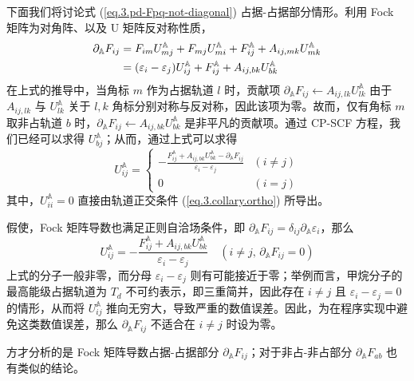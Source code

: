 下面我们将讨论式 (\ref{eq.3.pd-Fpq-not-diagonal}) 占据-占据部分情形。利用 Fock 矩阵为对角阵、以及 U 矩阵反对称性质，
\begin{align}
  \partial_{\mathbb{A}} F_{ij} &= F_{im} U_{mj}^{\mathbb{A}} + F_{mj} U_{mi}^{\mathbb{A}} + F_{ij}^{\mathbb{A}} + A_{ij, mk} U_{mk}^{\mathbb{A}} \notag\\
  &= (\varepsilon_i - \varepsilon_j) U_{ij}^{\mathbb{A}} + F_{ij}^{\mathbb{A}} + A_{ij, bk} U_{bk}^{\mathbb{A}}
\end{align}
在上式的推导中，当角标 $m$ 作为占据轨道 $l$ 时，贡献项 $\partial_{\mathbb{A}} F_{ij} \leftarrow A_{ij, lk} U_{lk}^{\mathbb{A}}$ 由于 $A_{ij, lk}$ 与 $U_{lk}^{\mathbb{A}}$ 关于 $l, k$ 角标分别对称与反对称，因此该项为零。故而，仅有角标 $m$ 取非占轨道 $b$ 时，$\partial_{\mathbb{A}} F_{ij} \leftarrow A_{ij, bk} U_{bk}^{\mathbb{A}}$ 是非平凡的贡献项。通过 CP-SCF 方程，我们已经可以求得 $U_{bj}^{\mathbb{A}}$；从而，通过上式可以求得
\begin{equation}
  U_{ij}^{\mathbb{A}} = 
  \begin{cases}
    \displaystyle
    - \frac{F_{ij}^{\mathbb{A}} + A_{ij, bk} U_{bk}^{\mathbb{A}} - \partial_{\mathbb{A}} F_{ij}}{\varepsilon_i - \varepsilon_j} & (i \neq j) \\
    0 & (i = j)
  \end{cases}
\end{equation}
其中，$U_{ii}^{\mathbb{A}} = 0$ 直接由轨道正交条件 (\ref{eq.3.collary.ortho}) 所导出。

假使，Fock 矩阵导数也满足正则自洽场条件，即 $\partial_{\mathbb{A}} F_{ij} = \delta_{ij} \partial_{\mathbb{A}} \varepsilon_i$，那么
\begin{equation}
  \label{eq.3.unstable-Uij}
  U_{ij}^{\mathbb{A}} = - \frac{F_{ij}^{\mathbb{A}} + A_{ij, bk} U_{bk}^{\mathbb{A}}}{\varepsilon_i - \varepsilon_j} \quad \left( i \neq j, \, \partial_{\mathbb{A}} F_{ij} = 0 \right)
\end{equation}
上式的分子一般非零，而分母 $\varepsilon_i - \varepsilon_j$ 则有可能接近于零；举例而言，甲烷分子的最高能级占据轨道为 $T_d$ 不可约表示，即三重简并，因此存在 $i \neq j$ 且 $\varepsilon_i - \varepsilon_j = 0$ 的情形，从而将 $U_{ij}^{\mathbb{A}}$ 推向无穷大，导致严重的数值误差。因此，为在程序实现中避免这类数值误差，那么 $\partial_{\mathbb{A}} F_{ij}$ 不适合在 $i \neq j$ 时设为零。

方才分析的是 Fock 矩阵导数占据-占据部分 $\partial_{\mathbb{A}} F_{ij}$；对于非占-非占部分 $\partial_{\mathbb{A}} F_{ab}$ 也有类似的结论。

